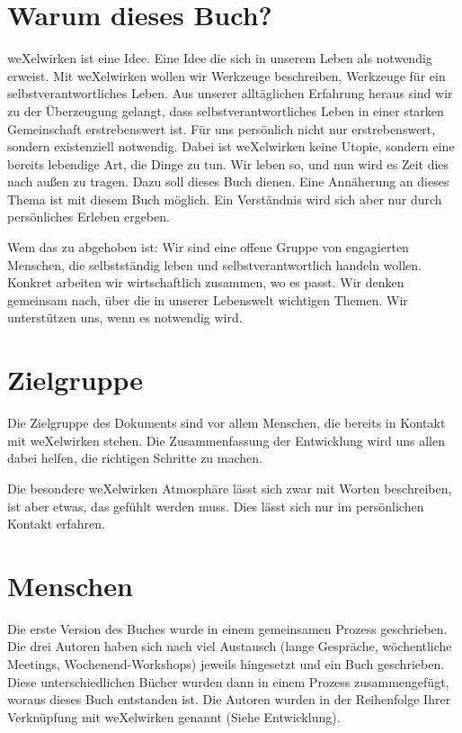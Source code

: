   \section{Warum dieses Buch?}
weXelwirken ist eine Idee.
%
Eine Idee die sich in unserem Leben als notwendig erweist. 
%
Mit weXelwirken wollen wir Werkzeuge beschreiben, Werkzeuge für ein selbstverantwortliches Leben.
%
Aus unserer alltäglichen Erfahrung heraus sind wir zu der Überzeugung gelangt, dass selbstverantwortliches Leben in einer starken Gemeinschaft erstrebenswert ist.
%
Für uns persönlich nicht nur erstrebenswert, sondern existenziell notwendig.
%
Dabei ist weXelwirken keine Utopie, sondern eine bereits lebendige Art, die Dinge zu tun.
%
Wir leben so, und nun wird es Zeit dies nach außen zu tragen.
%
Dazu soll dieses Buch dienen.
%
Eine Annäherung an dieses Thema ist mit diesem Buch möglich.
%
Ein Verständnis wird sich aber nur durch persönliches Erleben ergeben.



Wem das zu abgehoben ist: Wir sind eine offene Gruppe von engagierten Menschen, die selbstständig leben und selbstverantwortlich handeln wollen.
%
Konkret arbeiten wir wirtschaftlich zusammen, wo es passt.
%
Wir denken gemeinsam nach, über die in unserer Lebenswelt wichtigen Themen.
%
Wir unterstützen uns, wenn es notwendig wird.
  \section{Zielgruppe}
Die Zielgruppe des Dokuments sind vor allem Menschen, die bereits in Kontakt mit weXelwirken stehen.
%
Die Zusammenfassung der Entwicklung wird uns allen dabei helfen, die richtigen Schritte zu machen. 




Die besondere weXelwirken Atmosphäre lässt sich zwar mit Worten beschreiben, ist aber etwas, das gefühlt werden muss.
%
Dies lässt sich nur im persönlichen Kontakt erfahren.
  \section{Menschen}
Die erste Version des Buches wurde in einem gemeinsamen Prozess geschrieben.
%
Die drei Autoren haben sich nach viel Austausch (lange Gespräche, wöchentliche Meetings, Wochenend-Workshops) jeweils hingesetzt und ein Buch geschrieben.
%
Diese unterschiedlichen Bücher wurden dann in einem Prozess zusammengefügt, woraus dieses Buch entstanden ist.
%
Die Autoren wurden in der Reihenfolge Ihrer Verknüpfung mit weXelwirken genannt (Siehe Entwicklung).
